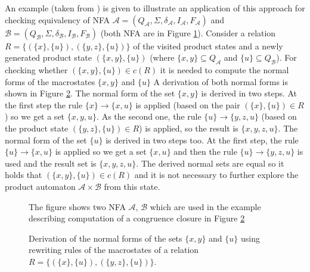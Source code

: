 An example (taken from \cite{popl13}) is given to illustrate an application of this approach for checking equivalency of 
NFA $\mathcal{A}=(Q_\mathcal{A},\Sigma,\delta_\mathcal{A},I_\mathcal{A},F_\mathcal{A})$ 
and $\mathcal{B}=(Q_\mathcal{B},\Sigma,\delta_\mathcal{B},I_\mathcal{B},F_\mathcal{B})$ (both NFA are in Figure \ref{figHKCex}). 
Consider a relation $R=\{(\{x\},\{u\}),(\{y,z\},\{u\})\}$ of the visited product states and a newly generated product state 
$(\{x,y\},\{u\})$ (where $\{x,y\}\subseteq Q_\mathcal{A}$ and 
$\{u\} \subseteq Q_\mathcal{B}$). For checking whether $(\{x,y\},\{u\})\in c(R)$ it is needed to compute the normal forms of the macrostates $\{x,y\}$ and $\{u\}$ 
A derivation of both normal forms is shown in Figure \ref{figHKCRew}. 
The normal form of the set $\{x,y\}$ is derived in two steps.
At the first step the rule $\{x\}\rightarrow\{x,u\}$ is applied (based on the pair $(\{x\},\{u\})\in R$) so we get a set $\{x,y,u\}$. As the second one, the rule 
$\{u\}\rightarrow\{y,z,u\}$ (based on the product state $(\{y,z\},\{u\})\in R$) is applied, so the result is $\{x,y,z,u\}$. The normal form of the set $\{u\}$
is derived in two steps too. At the first step, the rule $\{u\}\rightarrow\{x,u\}$ is applied so we get a set $\{x,u\}$ and then the rule 
$\{u\}\rightarrow\{y,z,u\}$ is used and the result set is $\{x,y,z,u\}$. The derived normal sets are equal so it holds that $(\{x,y\},\{u\})\in c(R)$ and
it is not necessary to further explore the product automaton $\mathcal{A}\times \mathcal{B}$ from this state.

\begin{figure}[bt]
\begin{center}
  
  
    \caption{The figure shows two NFA $\mathcal{A}$, $\mathcal{B}$ 
      which are used in the example describing computation of a congruence closure in Figure \ref{figHKCRew}}
		\label{figHKCex}
\end{center}
\end{figure}

\begin{figure}[bt]
  \begin{center}
    
    \caption{Derivation of the normal forms of the sets $\{x,y\}$ and $\{u\}$ using rewriting
      rules of the macrostates of a relation $R=\{(\{x\},\{u\}),(\{y,z\},\{u\})\}$.}
    \label{figHKCRew}
  \end{center}
\end{figure}

